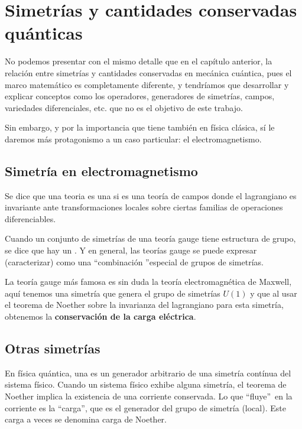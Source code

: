 
\chapter{Simetrías y cantidades conservadas quánticas}\label{ch:simetrias-y-cantidades-conservadas-quanticas}

No podemos presentar con el mismo detalle que en el capítulo anterior, la relación entre simetrías y cantidades conservadas en mecánica cuántica, pues el marco matemático es completamente diferente, y tendríamos que desarrollar y explicar conceptos como los operadores, generadores de simetrías, campos, variedades diferenciales, etc. que no es el objetivo de este trabajo.

Sin embargo, y por la importancia que tiene también en física clásica, sí le daremos más protagonismo a un caso particular: el electromagnetismo.

\section{Simetría en electromagnetismo}\label{sec:simetria-en-electromagnetismo}

Se dice que una teoria es una  si es una teoría de campos donde el lagrangiano es invariante ante transformaciones locales sobre ciertas familias de operaciones diferenciables\autocite{MAQFT}.

Cuando un conjunto de simetrías de una teoría gauge tiene estructura de grupo, se dice que hay un .
Y en general, las teorías gauge se puede expresar (caracterizar) como una \textquotedblleft combinación \textquotedblright especial de grupos de simetrías.

La teoría gauge más famosa es sin duda la teoría electromagnética de Maxwell, aquí tenemos una simetría que genera el grupo de simetrías $U(1)$ y que al usar el teorema de Noether sobre la invarianza del lagrangiano para esta simetría, obtenemos la \textbf{conservación de la carga eléctrica}.

\section{Otras simetrías}\label{sec:otras-simetrias}

En física quántica, una  es un generador arbitrario de una simetría contínua del sistema físico.
Cuando un sistema físico exhibe alguna simetría, el teorema de Noether implica la existencia de una corriente conservada.
Lo que \textquotedblleft fluye\textquotedblright\ en la corriente es la \textquotedblleft carga\textquotedblright, que es el generador del grupo de simetría (local).
Este carga a veces se denomina carga de Noether\autocite{W-CARGA}.

